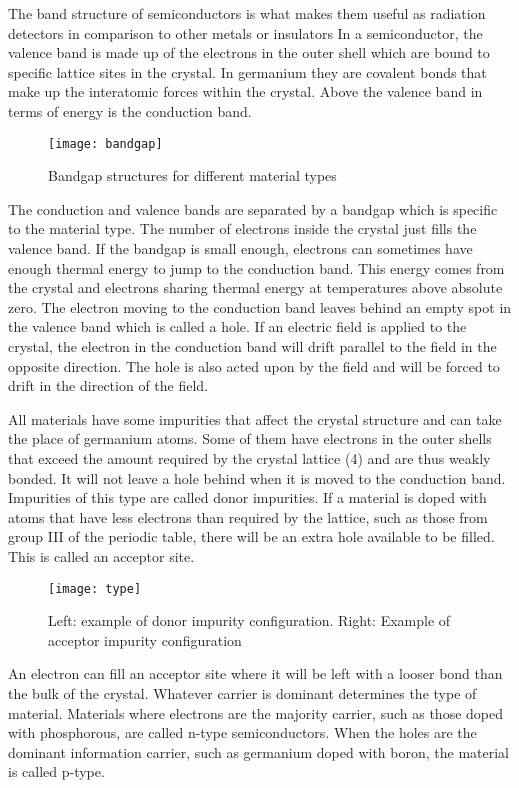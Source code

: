 The band structure of semiconductors is what makes them useful as radiation detectors in comparison to other metals or insulators
In a semiconductor, the valence band is made up of the electrons in the outer shell which are bound to specific lattice sites in the crystal.
In germanium they are covalent bonds that make up the interatomic forces within the crystal.
Above the valence band in terms of energy is the conduction band.
\begin{figure}[htpb]
\centering
\texttt{[image: bandgap]}
\caption{Bandgap structures for different material types}
\label{fig:bandgap}
\end{figure}
The conduction and valence bands are separated by a bandgap which is specific to the material type.
The number of electrons inside the crystal just fills the valence band.
If the bandgap is small enough, electrons can sometimes have enough thermal energy to jump to the conduction band.
This energy comes from the crystal and electrons sharing thermal energy at temperatures above absolute zero.
The electron moving to the conduction band leaves behind an empty spot in the valence band which is called a hole.
If an electric field is applied to the crystal, the electron in the conduction band will drift parallel to the field in the opposite direction.
The hole is also acted upon by the field and will be forced to drift in the direction of the field.

All materials have some impurities that affect the crystal structure and can take the place of germanium atoms.
Some of them have electrons in the outer shells that exceed the amount required by the crystal lattice (4) and are thus weakly bonded.
It will not leave a hole behind when it is moved to the conduction band.
Impurities of this type are called donor impurities.
If a material is doped with atoms that have less electrons than required by the lattice, such as those from group III of the periodic table, there will be an extra hole available to be filled.  This is called an acceptor site.
\begin{figure}[htpb]
\centering
\texttt{[image: type]}
\caption{Left: example of donor impurity configuration. Right: Example of acceptor impurity configuration}
\label{fig:type}
\end{figure}
An electron can fill an acceptor site where it will be left with a looser bond than the bulk of the crystal.
Whatever carrier is dominant determines the type of material.
Materials where electrons are the majority carrier, such as those doped with phosphorous, are called n-type semiconductors.
When the holes are the dominant information carrier, such as germanium doped with boron, the material is called p-type.

